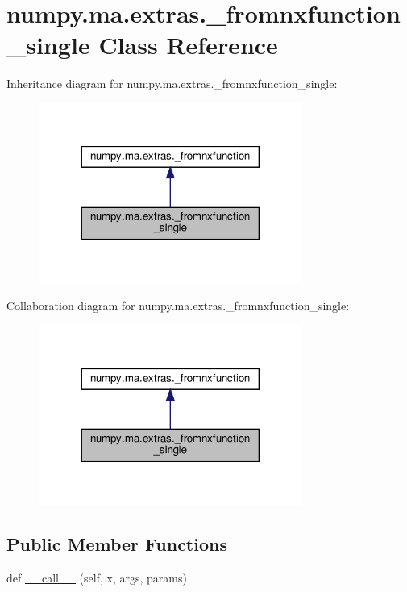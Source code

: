 \hypertarget{classnumpy_1_1ma_1_1extras_1_1__fromnxfunction__single}{}\section{numpy.\+ma.\+extras.\+\_\+fromnxfunction\+\_\+single Class Reference}
\label{classnumpy_1_1ma_1_1extras_1_1__fromnxfunction__single}


Inheritance diagram for numpy.\+ma.\+extras.\+\_\+fromnxfunction\+\_\+single\+:
\nopagebreak
\begin{figure}[H]
\begin{center}
\leavevmode
\includegraphics[width=245pt]{classnumpy_1_1ma_1_1extras_1_1__fromnxfunction__single__inherit__graph}
\end{center}
\end{figure}


Collaboration diagram for numpy.\+ma.\+extras.\+\_\+fromnxfunction\+\_\+single\+:
\nopagebreak
\begin{figure}[H]
\begin{center}
\leavevmode
\includegraphics[width=245pt]{classnumpy_1_1ma_1_1extras_1_1__fromnxfunction__single__coll__graph}
\end{center}
\end{figure}
\subsection*{Public Member Functions}
\begin{DoxyCompactItemize}
\item 
def \hyperlink{classnumpy_1_1ma_1_1extras_1_1__fromnxfunction__single_a75f09b57fe50e6d7caf3d66bed2ce07d}{\+\_\+\+\_\+call\+\_\+\+\_\+} (self, x, args, params)
\end{DoxyCompactItemize}


